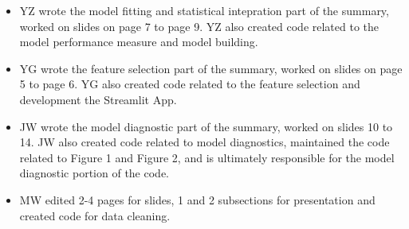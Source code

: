 \documentclass[12pt]{article}
\begin{document}
\begin{itemize}
\item YZ wrote the model fitting and statistical intepration part of the summary, worked on slides on page 7 to page 9. YZ also created code related to the model performance measure and model building.
\item YG wrote the feature selection part of the summary, worked on slides on page 5 to page 6. YG also created code related to the feature selection and development the Streamlit App.
\item JW wrote the model diagnostic part of the summary, worked on slides 10 to 14. JW also created code related to model diagnostics, maintained the code related to Figure 1 and Figure 2, and is ultimately responsible for the model diagnostic portion of the code.
\item MW edited 2-4 pages for slides, 1 and 2 subsections for presentation and created code for data cleaning.
\end{itemize}
\end{document}
